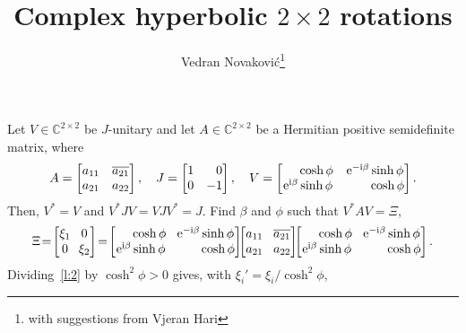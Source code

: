 \documentclass[a4paper,12pt,twoside]{article}
\title{Complex hyperbolic $2\times 2$ rotations}
\author{Vedran Novakovi\'{c}\footnote{with suggestions from Vjeran Hari}}
\begin{document}
\maketitle
Let $V\in\mathbb{C}^{2\times 2}$ be $J$-unitary and let
$A\in\mathbb{C}^{2\times 2}$ be a Hermitian positive semidefinite
matrix, where
\begin{equation}
  A=\begin{bmatrix}
  a_{11} & \overline{a_{21}}\\
  a_{21} & a_{22}
  \end{bmatrix},\quad
  J=\begin{bmatrix}
  1 & \hphantom{-}0\\
  0 & -1
  \end{bmatrix},\quad
  V=\begin{bmatrix}
  \hphantom{\mathrm{e}^{\mathrm{i}\beta}}\cosh\phi & \mathrm{e}^{-\mathrm{i}\beta}\sinh\phi\\
  \mathrm{e}^{\mathrm{i}\beta}\sinh\phi & \hphantom{\mathrm{e}^{-\mathrm{i}\beta}}\cosh\phi
  \end{bmatrix}.
  \label{e:1}
\end{equation}
Then, $V^{\ast}=V$ and $V^{\ast}JV=VJV^{\ast}=J$.  Find $\beta$ and
$\phi$ such that $V^{\ast}AV=\Xi$,
\begin{equation}
  \Xi\!=\!\begin{bmatrix}
  \xi_1 & \!\!0\\
  0 & \!\!\xi_2
  \end{bmatrix}\!=\!\begin{bmatrix}
  \hphantom{\mathrm{e}^{\mathrm{i}\beta}}\cosh\phi & \!\mathrm{e}^{-\mathrm{i}\beta}\sinh\phi\\
  \mathrm{e}^{\mathrm{i}\beta}\sinh\phi & \!\hphantom{\mathrm{e}^{-\mathrm{i}\beta}}\cosh\phi
  \end{bmatrix}\!\!\begin{bmatrix}
  a_{11} & \!\overline{a_{21}}\\
  a_{21} & \!a_{22}
  \end{bmatrix}\!\!\begin{bmatrix}
  \hphantom{\mathrm{e}^{\mathrm{i}\beta}}\cosh\phi & \!\mathrm{e}^{-\mathrm{i}\beta}\sinh\phi\\
  \mathrm{e}^{\mathrm{i}\beta}\sinh\phi & \!\hphantom{\mathrm{e}^{-\mathrm{i}\beta}}\cosh\phi
  \end{bmatrix}.
  \label{l:2}
\end{equation}
Dividing~\eqref{l:2} by $\cosh^2\phi>0$ gives, with
$\xi_i'=\xi_i^{}/\cosh^2\phi$,
\end{document}
